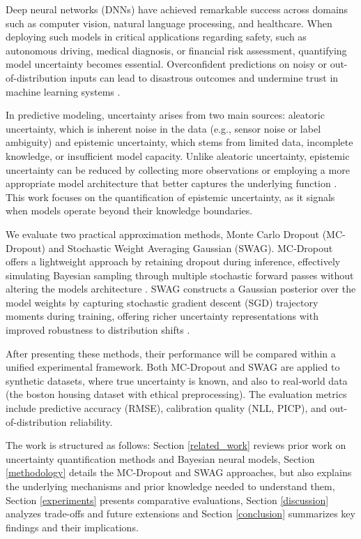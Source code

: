 
Deep neural networks (DNNs) have achieved remarkable success across domains such as computer vision,
natural language processing, and healthcare. When deploying such models in critical applications 
regarding safety, such as autonomous driving, medical diagnosis, or financial risk assessment,
quantifying model uncertainty becomes essential. Overconfident predictions on noisy or
out-of-distribution inputs can lead to disastrous outcomes and undermine
trust in machine learning systems \citep{pereira2020challenges, valentin2024certification}.

\vspace{0.15cm}
In predictive modeling, uncertainty arises from two main sources: aleatoric uncertainty,
which is inherent noise in the data (e.g., sensor noise or label ambiguity) and epistemic uncertainty,
which stems from limited data, incomplete knowledge, or insufficient model capacity. Unlike aleatoric
uncertainty, epistemic uncertainty can be reduced by collecting more observations or employing a more
appropriate model architecture that better captures the underlying function
\citep{hullermeier2021aleatoric}. This work focuses on the quantification of epistemic uncertainty,
as it signals when models operate beyond their knowledge boundaries.

\vspace{0.15cm}
We evaluate two practical approximation methods, Monte Carlo Dropout (MC-Dropout) and Stochastic Weight
Averaging Gaussian (SWAG). MC‑Dropout offers a lightweight approach by retaining dropout during inference,
effectively simulating Bayesian sampling through multiple stochastic forward passes without altering the
models architecture \citep{gal2016mcdropout}. SWAG constructs a Gaussian posterior over the model weights
by capturing stochastic gradient descent (SGD) trajectory moments during training, offering richer
uncertainty representations with improved robustness to distribution shifts \citep{maddox2019swag}.

\vspace{0.15cm}
After presenting these methods, their performance will be compared within a unified experimental framework.
Both MC‑Dropout and SWAG are applied to synthetic datasets, where true uncertainty is known,
and also to real‑world data (the boston housing dataset with ethical preprocessing). The evaluation metrics
include predictive accuracy (RMSE), calibration quality (NLL, PICP), and out-of-distribution reliability.

\vspace{0.15cm}
The work is structured as follows: Section \ref{related_work} reviews prior work on uncertainty
quantification methods and Bayesian neural models,
Section \ref{methodology} details the MC‑Dropout and SWAG approaches,
but also explains the underlying mechanisms and prior knowledge needed to understand them,
Section \ref{experiments} presents comparative evaluations,
Section \ref{discussion} analyzes trade-offs and future extensions and
Section \ref{conclusion} summarizes key findings and their implications.
